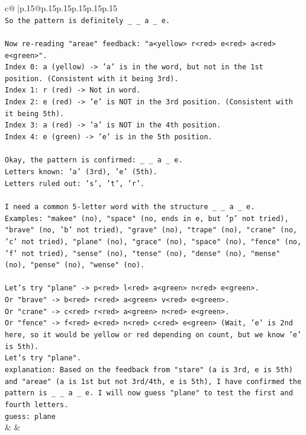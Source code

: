 \documentclass{article}
\begin{document}
{\begin{supertabular}{c@{$\;$}|p{.15\linewidth}@{}p{.15\linewidth}p{.15\linewidth}p{.15\linewidth}p{.15\linewidth}p{.15\linewidth}}
{{{\\ 
\texttt{So the pattern is definitely \_ \_ a \_ e.} \\
\\ 
\texttt{Now re{-}reading "areae" feedback: "a<yellow> r<red> e<red> a<red> e<green>".} \\
\texttt{Index 0: a (yellow) {-}> 'a' is in the word, but not in the 1st position. (Consistent with it being 3rd).} \\
\texttt{Index 1: r (red) {-}> Not in word.} \\
\texttt{Index 2: e (red) {-}> 'e' is NOT in the 3rd position. (Consistent with it being 5th).} \\
\texttt{Index 3: a (red) {-}> 'a' is NOT in the 4th position.} \\
\texttt{Index 4: e (green) {-}> 'e' is in the 5th position.} \\
\\ 
\texttt{Okay, the pattern is confirmed: \_ \_ a \_ e.} \\
\texttt{Letters known: 'a' (3rd), 'e' (5th).} \\
\texttt{Letters ruled out: 's', 't', 'r'.} \\
\\ 
\texttt{I need a common 5{-}letter word with the structure \_ \_ a \_ e.} \\
\texttt{Examples: "makee" (no), "space" (no, ends in e, but 'p' not tried), "brave" (no, 'b' not tried), "grave" (no), "trape" (no), "crane" (no, 'c' not tried), "plane" (no), "grace" (no), "space" (no), "fence" (no, 'f' not tried), "sense" (no), "tense" (no), "dense" (no), "mense" (no), "pense" (no), "wense" (no).} \\
\\ 
\texttt{Let's try "plane" {-}> p<red> l<red> a<green> n<red> e<green>.} \\
\texttt{Or "brave" {-}> b<red> r<red> a<green> v<red> e<green>.} \\
\texttt{Or "crane" {-}> c<red> r<red> a<green> n<red> e<green>.} \\
\texttt{Or "fence" {-}> f<red> e<red> n<red> c<red> e<green> (Wait, 'e' is 2nd here, so it would be yellow or red depending on count, but we know 'e' is 5th).} \\
\texttt{Let's try "plane".} \\
\texttt{explanation: Based on the feedback from "stare" (a is 3rd, e is 5th) and "areae" (a is 1st but not 3rd/4th, e is 5th), I have confirmed the pattern is \_ \_ a \_ e. I will now guess "plane" to test the first and fourth letters.} \\
\texttt{guess: plane} \\
            }
        }
    }
    & & \\ \\


\end{supertabular}}
\end{document}
